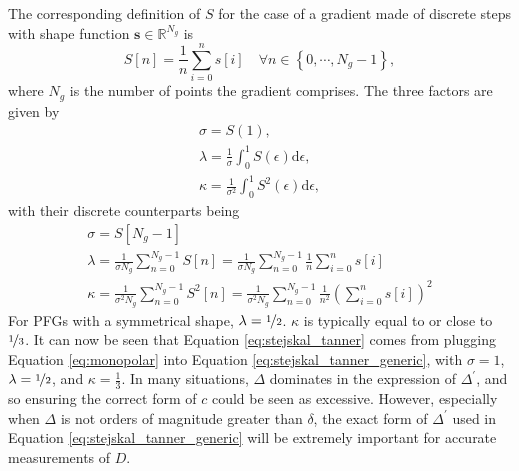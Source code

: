 The corresponding definition of $S$ for the case of a gradient made of discrete
steps with shape function $\symbf{s} \in \mathbb{R}^{N_g}$ is
\begin{equation}
    S\left[n\right] =
        \frac{1}{n} \sum_{i = 0}^{n} s\left[i\right] \quad
        \forall n \in \left\lbrace 0, \cdots, N_g - 1\right\rbrace,
\end{equation}
where $N_g$ is the number of points the gradient comprises. The three factors
are given by
\begin{subequations}
    \begin{gather}
        \sigma = S(1),\\
        \lambda = \frac{1}{\sigma} \int_0^1 S(\epsilon) \mathrm{d} \epsilon,\\
        \kappa = \frac{1}{\sigma^2} \int_0^1 S^2(\epsilon) \mathrm{d} \epsilon,
    \end{gather}
\end{subequations}
with their discrete counterparts being
\begin{subequations}
    \begin{gather}
        \sigma = S\left[N_g - 1\right] \\
        \lambda = \frac{1}{\sigma N_g} \sum_{n = 0}^{N_g - 1} S\left[n\right]
            = \frac{1}{\sigma N_g} \sum_{n = 0}^{N_g - 1}
            \frac{1}{n} \sum_{i=0}^{n} s\left[i\right]\\
        \kappa = \frac{1}{\sigma^2 N_g} \sum_{n = 0}^{N_g - 1} S^2\left[n\right]
            = \frac{1}{\sigma^2 N_g} \sum_{n = 0}^{N_g - 1}
            \frac{1}{n^2} \left(\sum_{i=0}^{n} s\left[i\right]\right)^2
    \end{gather}
\end{subequations}
For \acp{PFG} with a symmetrical shape, $\lambda = \nicefrac{1}{2}$. $\kappa$
is typically equal to or close to $\nicefrac{1}{3}$. It can now be seen that
Equation \ref{eq:stejskal_tanner} comes from plugging Equation
\ref{eq:monopolar} into Equation \ref{eq:stejskal_tanner_generic}, with $\sigma
= 1$,  $\lambda = \nicefrac{1}{2}$, and  $\kappa = \frac{1}{3}$. In many
situations,  $\Delta$ dominates in the expression of $\Delta^{\prime}$, and so
ensuring the correct form of $c$ could be seen as excessive. However,
especially when  $\Delta$ is not orders of magnitude greater than $\delta$, the
exact form of $\Delta^{\prime}$ used in Equation
\ref{eq:stejskal_tanner_generic} will be extremely important for accurate
measurements of $D$.


